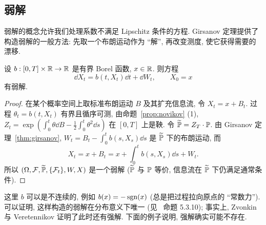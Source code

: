 \subsection{弱解}

弱解的概念允许我们处理系数不满足 Lipschitz 条件的方程. Girsanov 定理提供了构造弱解的一般方法: 先取一个布朗运动作为 ``解'', 再改变测度, 使它获得需要的漂移.

\begin{proposition}\label{prop:weak-girsanov}
设 $b:[0,T]\times\R\to\R$ 是有界 Borel 函数, $x\in\R$. 则方程
\[
\dd X_t=b(t,X_t)\dd t+\dd W_t,\qquad X_0=x
\]
有弱解.
\end{proposition}

\begin{proof}
在某个概率空间上取标准布朗运动 $B$ 及其扩充信息流, 令 $X_t=x+B_t$. 过程 $\theta_t=b(t,X_t)$ 有界且循序可测, 由命题~\ref{prop:novikov} (1), $Z_t=\exp(\int_0^t\theta\dd B-\frac{1}{2}\int_0^t\theta^2\dd s)$ 在 $[0,T]$ 上是鞅. 令 $\widetilde{\P}=Z_T\cdot\P$. 由 Girsanov 定理~\ref{thm:girsanov}, $W_t=B_t-\int_0^tb(s,X_s)\dd s$ 是 $\widetilde{\P}$ 下的布朗运动, 而
\[
X_t=x+B_t=x+\int_0^tb(s,X_s)\dd s+W_t.
\]
所以 $(\Omega,\mathcal{F},\widetilde{\P},\{\mathcal{F}_t\},W,X)$ 是一个弱解 ($\widetilde{\P}$ 与 $\P$ 等价, 信息流在 $\widetilde{\P}$ 下仍满足通常条件).
\end{proof}

这里 $b$ 可以是不连续的, 例如 $b(x)=-\sgn(x)$ (总是把过程拉向原点的 ``常数力''). 可以证明, 这样构造的弱解在分布意义下唯一 (见~\cite{karatzas} 命题 5.3.10); 事实上, Zvonkin 与 Veretennikov 证明了此时还有强解. 下面的例子说明, 强解确实可能不存在.


